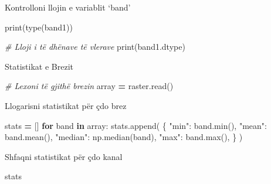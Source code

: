 \documentclass[
  ignorenonframetext,
]{beamer}
\newenvironment{Shaded}{\begin{snugshade}}{\end{snugshade}}
\newcommand{\BuiltInTok}[1]{#1}
\newcommand{\CommentTok}[1]{\textcolor[rgb]{0.56,0.35,0.01}{\textit{#1}}}
\newcommand{\ControlFlowTok}[1]{\textcolor[rgb]{0.13,0.29,0.53}{\textbf{#1}}}
\newcommand{\KeywordTok}[1]{\textcolor[rgb]{0.13,0.29,0.53}{\textbf{#1}}}
\newcommand{\NormalTok}[1]{#1}
\newcommand{\OperatorTok}[1]{\textcolor[rgb]{0.81,0.36,0.00}{\textbf{#1}}}
\newcommand{\StringTok}[1]{\textcolor[rgb]{0.31,0.60,0.02}{#1}}
\begin{document}
\begin{frame}[fragile]{Kontrolloni llojin e variablit `band'}
\protect\hypertarget{kontrolloni-llojin-e-variablit-band}{}

\begin{Shaded}
\begin{Highlighting}[]
\BuiltInTok{print}\NormalTok{(}\BuiltInTok{type}\NormalTok{(band1))}

\CommentTok{\# Lloji i të dhënave të vlerave}
\BuiltInTok{print}\NormalTok{(band1.dtype)}
\end{Highlighting}
\end{Shaded}
\end{frame}

\begin{frame}[fragile]{Statistikat e Brezit}
\protect\hypertarget{statistikat-e-brezit}{}

\begin{Shaded}
\begin{Highlighting}[]
\CommentTok{\# Lexoni të gjithë brezin}
\NormalTok{array }\OperatorTok{=}\NormalTok{ raster.read()}
\end{Highlighting}
\end{Shaded}
\end{frame}

\begin{frame}[fragile]{Llogarisni statistikat për çdo brez}
\protect\hypertarget{llogarisni-statistikat-puxebr-uxe7do-brez}{}

\begin{Shaded}
\begin{Highlighting}[]
\NormalTok{stats }\OperatorTok{=}\NormalTok{ []}
\ControlFlowTok{for}\NormalTok{ band }\KeywordTok{in}\NormalTok{ array:}
\NormalTok{    stats.append(}
\NormalTok{        \{}
            \StringTok{"min"}\NormalTok{: band.}\BuiltInTok{min}\NormalTok{(),}
            \StringTok{"mean"}\NormalTok{: band.mean(),}
            \StringTok{"median"}\NormalTok{: np.median(band),}
            \StringTok{"max"}\NormalTok{: band.}\BuiltInTok{max}\NormalTok{(),}
\NormalTok{        \}}
\NormalTok{    )}
\end{Highlighting}
\end{Shaded}
\end{frame}

\begin{frame}[fragile]{Shfaqni statistikat për çdo kanal}
\protect\hypertarget{shfaqni-statistikat-puxebr-uxe7do-kanal}{}

\begin{Shaded}
\begin{Highlighting}[]
\NormalTok{stats}
\end{Highlighting}
\end{Shaded}
\end{frame}
\end{document}
